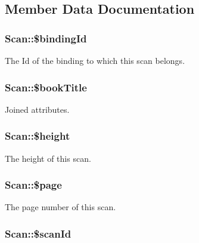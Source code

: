 \subsection{Member Data Documentation}
\hypertarget{classScan_a966a05e2f36cbb45f71123414db8aafa}{
\subsubsection[{\$bindingId}]{\setlength{\rightskip}{0pt plus 5cm}Scan::\$bindingId}}
\label{classScan_a966a05e2f36cbb45f71123414db8aafa}
The Id of the binding to which this scan belongs. \hypertarget{classScan_a82f0e949f2e2d21402be3299719d04e9}{
\subsubsection[{\$bookTitle}]{\setlength{\rightskip}{0pt plus 5cm}Scan::\$bookTitle}}
\label{classScan_a82f0e949f2e2d21402be3299719d04e9}
Joined attributes. \hypertarget{classScan_a4504208647e43fc37d30da80988c7ebb}{
\subsubsection[{\$height}]{\setlength{\rightskip}{0pt plus 5cm}Scan::\$height}}
\label{classScan_a4504208647e43fc37d30da80988c7ebb}
The height of this scan. \hypertarget{classScan_a5c7dcddddb9fbb8d6f97a1f0772753c7}{
\subsubsection[{\$page}]{\setlength{\rightskip}{0pt plus 5cm}Scan::\$page}}
\label{classScan_a5c7dcddddb9fbb8d6f97a1f0772753c7}
The page number of this scan. \hypertarget{classScan_a4a0ff118e90fc192615f59bbb32e5a7e}{
\subsubsection[{\$scanId}]{\setlength{\rightskip}{0pt plus 5cm}Scan::\$scanId}}
